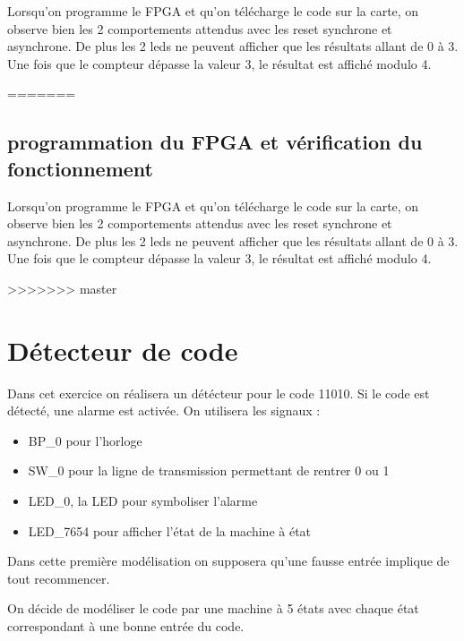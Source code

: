 \documentclass[11pt]{report}
\begin{document}
   Lorsqu'on programme le FPGA et qu'on télécharge le code sur la carte, on observe bien les 2 comportements attendus avec les reset synchrone et asynchrone.
   De plus les 2 leds ne peuvent afficher que les résultats allant de 0 à 3. Une fois que le compteur dépasse la valeur 3, le résultat est affiché modulo 4.


\newpage
\newpage


=======
  
   \subsection{programmation du FPGA et vérification du fonctionnement}
   
   Lorsqu'on programme le FPGA et qu'on télécharge le code sur la carte, on observe bien les 2 comportements attendus avec les reset synchrone et asynchrone. 
   De plus les 2 leds ne peuvent afficher que les résultats allant de 0 à 3. Une fois que le compteur dépasse la valeur 3, le résultat est affiché modulo 4. 
   

   
 
>>>>>>> master

\section{Détecteur de code}

Dans cet exercice on réalisera un détécteur pour le code 11010. Si le code est détecté, une alarme est activée. On utilisera les signaux :
\begin{itemize}
	\item BP\_0 pour l'horloge
	\item SW\_0 pour la ligne de transmission permettant de rentrer 0 ou 1
	\item LED\_0, la LED pour symboliser l'alarme
	\item LED\_7654 pour afficher l'état de la machine à état

\end{itemize}

Dans cette première modélisation on supposera qu'une fausse entrée implique de tout recommencer.

On décide de modéliser le code par une machine à 5 états avec chaque état correspondant à une bonne entrée du code.

\end{document}
